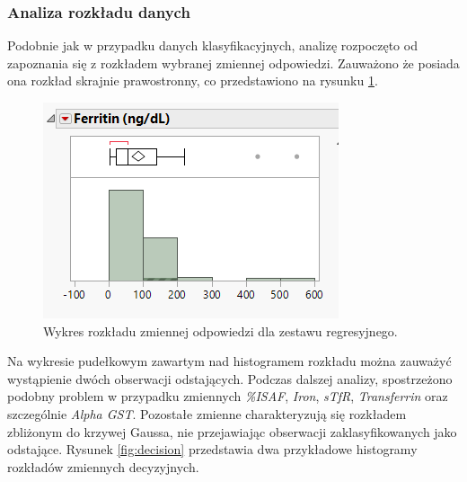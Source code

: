 	\subsubsection{Analiza rozkładu danych}
	
	Podobnie jak w przypadku danych klasyfikacyjnych, analizę rozpoczęto od zapoznania się z rozkładem wybranej zmiennej odpowiedzi. Zauważono że posiada ona rozkład skrajnie prawostronny, co przedstawiono na rysunku \ref{fig:ferritin}.
	
	\begin{figure}[!ht]
		\centering
		\includegraphics[width=0.5\linewidth]{Rozdzial3/ferritin}
		\caption{Wykres rozkładu zmiennej odpowiedzi dla zestawu regresyjnego.}
		\label{fig:ferritin}
	\end{figure}
	
	Na wykresie pudełkowym zawartym nad histogramem rozkładu można zauważyć wystąpienie dwóch obserwacji odstających. Podczas dalszej analizy, spostrzeżono podobny problem w przypadku zmiennych \textit{\%ISAF}, \textit{Iron}, \textit{sTfR}, \textit{Transferrin} oraz szczególnie \textit{Alpha GST}. Pozostałe zmienne charakteryzują się rozkładem zbliżonym do krzywej Gaussa, nie przejawiając obserwacji zaklasyfikowanych jako odstające. Rysunek \ref{fig:decision} przedstawia dwa przykładowe histogramy rozkładów zmiennych decyzyjnych.
	
